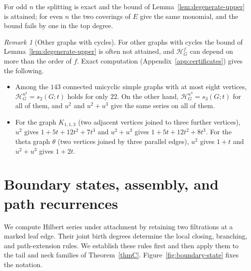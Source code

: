 \documentclass[reqno]{article}
\theoremstyle{plain} %
\theoremstyle{definition}
\theoremstyle{remark}
\newtheorem{remark}[theorem]{\sc Remark}
\newcommand{\hs}{\mathscr{H}}
\numberwithin{equation}{section}
\begin{document}
For odd $n$ the splitting is exact and the bound of
Lemma~\ref{lem:degenerate-upper} is attained; for even $n$ the two
coverings of $E$ give the same monomial, and the bound fails by one in
the top degree.

\begin{remark}[Other graphs with cycles]\label{rem:degenerate-cycles}
For other graphs with cycles the bound of
Lemma~\ref{lem:degenerate-upper} is often not attained, and $\hs_G^f$ can
depend on more than the order of $f$. Exact computation
(Appendix~\ref{app:certificates}) gives the following.
\begin{itemize}
\item Among the $143$ connected unicyclic simple graphs with at most
eight vertices, $\hs_G^{u^2}=s_2(G;t)$ holds for only $22$. On the other
hand, $\hs_G^{u^3}=s_3(G;t)$ for all of them, and $u^2$ and $u^2+u^3$
give the same series on all of them.
\item For the graph $K_{1,1,3}$ (two adjacent vertices joined to three
further vertices), $u^2$ gives $1+5t+12t^2+7t^3$ and $u^2+u^3$ gives
$1+5t+12t^2+8t^3$. For the theta graph $\theta$ (two vertices joined by
three parallel edges), $u^2$ gives $1+t$ and $u^2+u^3$ gives $1+2t$.
\end{itemize}
\end{remark}

\section{Boundary states, assembly, and path recurrences}
\label{sec:proofs}

We compute Hilbert series under attachment by retaining two filtrations
at a marked leaf edge. Their joint birth degrees determine the local
closing, branching, and path-extension rules. We establish these rules
first and then apply them to the tail and neck families of
Theorem~\ref{thmC}. Figure~\ref{fig:boundary-state} fixes the notation.
\end{document}
